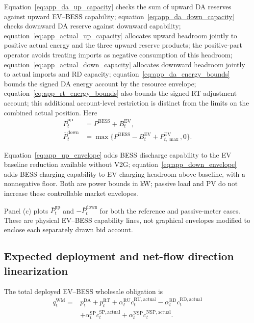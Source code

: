 \documentclass[final,5p,times]{elsarticle}
\newcommand{\EV}{\mathrm{EV}}
\newcommand{\BESS}{\mathrm{BESS}}
\newcommand{\DA}{\mathrm{DA}}
\newcommand{\RT}{\mathrm{RT}}
\newcommand{\RU}{\mathrm{RU}}
\newcommand{\RD}{\mathrm{RD}}
\newcommand{\SP}{\mathrm{SP}}
\newcommand{\NSP}{\mathrm{NSP}}
\newcommand{\WM}{\mathrm{WM}}
\newcommand{\actual}{\mathrm{actual}}
\begin{document}
Equation~\eqref{eq:app_da_up_capacity} checks the sum of upward DA reserves against upward EV--BESS capability; equation~\eqref{eq:app_da_down_capacity} checks downward DA reserve against downward capability; equation~\eqref{eq:app_actual_up_capacity} allocates upward headroom jointly to positive actual energy and the three upward reserve products; the positive-part operator avoids treating imports as negative consumption of this headroom; equation~\eqref{eq:app_actual_down_capacity} allocates downward headroom jointly to actual imports and RD capacity; equation~\eqref{eq:app_da_energy_bounds} bounds the signed DA energy account by the resource envelope; equation~\eqref{eq:app_rt_energy_bounds} also bounds the signed RT adjustment account; this additional account-level restriction is distinct from the limits on the combined actual position.
Here
\begin{align}
\bar P_t^{\mathrm{up}}&=P^{\BESS}+B_t^{\EV},\label{eq:app_up_envelope}\\
\bar P_t^{\mathrm{down}}&=\max\{P^{\BESS}-B_t^{\EV}+P_{t,\max}^{\EV},0\}.\label{eq:app_down_envelope}
\end{align}


Equation~\eqref{eq:app_up_envelope} adds BESS discharge capability to the EV
baseline reduction available without V2G; equation~\eqref{eq:app_down_envelope}
adds BESS charging capability to EV charging headroom above baseline, with a
nonnegative floor. Both are power bounds in kW; passive load and PV do not
increase these controllable market envelopes.

Panel (c) plots $\bar P_t^{\mathrm{up}}$ and
$-\bar P_t^{\mathrm{down}}$ for both the reference and passive-meter cases.
These are physical EV--BESS capability lines, not graphical envelopes modified
to enclose each separately drawn bid account.

\subsection{Expected deployment and net-flow direction linearization}
The total deployed EV--BESS wholesale obligation is
\begin{align}
q_t^{\WM}={}&p_t^{\DA}+p_t^{\RT}
+\alpha_t^{\RU}c_t^{\RU,\actual}
-\alpha_t^{\RD}c_t^{\RD,\actual}\nonumber\\
&+\alpha_t^{\SP}c_t^{\SP,\actual}
+\alpha_t^{\NSP}c_t^{\NSP,\actual}. \label{eq:app_obligation}
\end{align}
\end{document}
